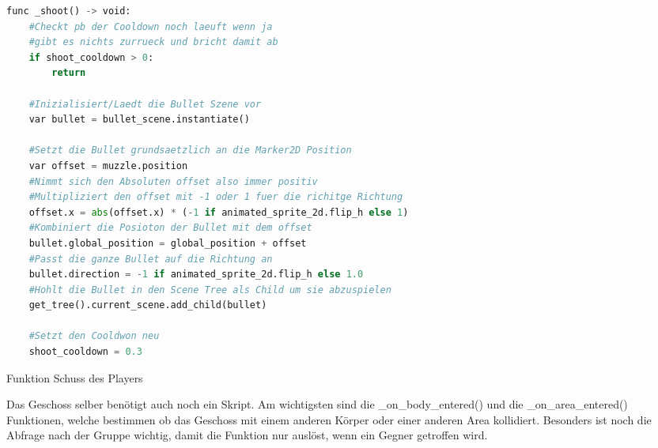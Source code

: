 \documentclass{article}
\begin{document}
\begin{table}[h]
	\begin{tcolorbox}[colframe=Black, sharp corners, boxrule=0.5mm, colback=white]
		
		\vspace{-5mm}
		
\begin{lstlisting}[language=Python]
func _shoot() -> void:
	#Checkt pb der Cooldown noch laeuft wenn ja
	#gibt es nichts zurrueck und bricht damit ab
	if shoot_cooldown > 0:
		return

	#Inizialisiert/Laedt die Bullet Szene vor
	var bullet = bullet_scene.instantiate()
	
	#Setzt die Bullet grundsaetzlich an die Marker2D Position
	var offset = muzzle.position
	#Nimmt sich den Absoluten offset also immer positiv
	#Multipliziert den offset mit -1 oder 1 fuer die richitge Richtung
	offset.x = abs(offset.x) * (-1 if animated_sprite_2d.flip_h else 1)
	#Kombiniert die Posioton der Bullet mit dem offset
	bullet.global_position = global_position + offset
	#Passt die ganze Bullet auf die Richtung an
	bullet.direction = -1 if animated_sprite_2d.flip_h else 1.0
	#Hohlt die Bullet in den Scene Tree als Child um sie abzuspielen
	get_tree().current_scene.add_child(bullet)

	#Setzt den Cooldwon neu
	shoot_cooldown = 0.3
\end{lstlisting}
	\end{tcolorbox}
	\vspace{-5mm}
	
	\tiny{\caption {Funktion Schuss des Players}}
	\label{Schuss Funktion Player}
\end{table}

\newpage

Das Geschoss selber benötigt auch noch ein Skript. Am wichtigsten sind die \_on\_body\_entered() und die \_on\_area\_entered() Funktionen, welche bestimmen ob das Geschoss mit einem anderen Körper oder einer anderen Area kollidiert. Besonders ist noch die Abfrage nach der Gruppe wichtig, damit die Funktion nur auslöst, wenn ein Gegner getroffen wird. 
\end{document}
